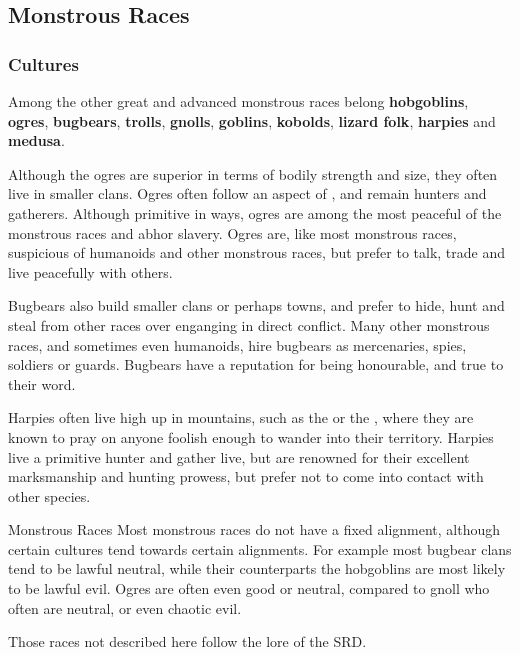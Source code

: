 \subsection{Monstrous Races}
\label{sec:Monstrous Races}

\subsubsection{Cultures}

Among the other great and advanced monstrous races belong \textbf{hobgoblins},
\textbf{ogres}, \textbf{bugbears}, \textbf{trolls}, \textbf{gnolls},
\textbf{goblins}, \textbf{kobolds}, \textbf{lizard folk}, \textbf{harpies}
and \textbf{medusa}.

Although the ogres are superior in terms of bodily strength and size, they
often live in smaller clans. Ogres often follow an aspect of
, and remain hunters and gatherers. Although primitive
in ways, ogres are among the most peaceful of the monstrous races and abhor
slavery. Ogres are, like most monstrous races, suspicious of humanoids and
other monstrous races, but prefer to talk, trade and live peacefully with
others.

Bugbears also build smaller clans or perhaps towns, and prefer to hide, hunt
and steal from other races over enganging in direct conflict. Many other
monstrous races, and sometimes even humanoids, hire bugbears as mercenaries,
spies, soldiers or guards. Bugbears have a reputation for being honourable,
and true to their word.

Harpies often live high up in mountains, such as the 
or the , where they are known to pray on anyone
foolish enough to wander into their territory. Harpies live a primitive hunter
and gather live, but are renowned for their excellent marksmanship and hunting
prowess, but prefer not to come into contact with other species.

\begin{35e}{Monstrous Races}
  Most monstrous races do not have a fixed alignment, although certain
  cultures tend towards certain alignments. For example most bugbear clans
  tend to be lawful neutral, while their counterparts the hobgoblins are most
  likely to be lawful evil. Ogres are often even good or neutral, compared to
  gnoll who often are neutral, or even chaotic evil.

  Those races not described here follow the lore of the SRD.
\end{35e}
